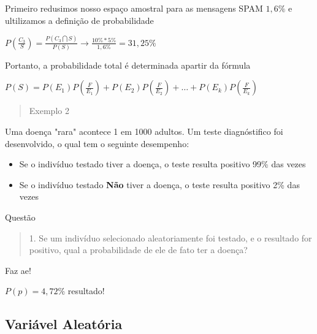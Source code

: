 \documentclass{article}
\begin{document}
    Primeiro redusimos nosso espaço amostral para as mensagens SPAM $ 1,6\% $ e ultilizamos a definição
    de probabilidade 

    \begin{center}
      \begin{large}
        $ P(\frac{C_3}{S}) = \frac{P(C_3 \bigcap S)}{P(S)} \rightarrow  \frac{10\% * 5\%}{1,6\%} = 31,25\% $
      \end{large}
      \end{center}

    Portanto, a probabilidade total é determinada apartir da fórmula
    
    \begin{center}
          $ P(S) = P(E_1) P( \frac{F}{E_1}) + P(E_2) P( \frac{F}{E_2}) + \dots + P(E_k) P( \frac{F}{E_k})  $
    \end{center}

    \newpage
    
    \begin{quote}
      Exemplo 2
    \end{quote}

    Uma doença "rara" acontece 1 em 1000 adultos. Um teste diagnóstifico foi desenvolvido,
    o qual tem o seguinte desempenho:

    \begin{itemize}
      \item Se o indivíduo testado tiver a doença, o teste resulta positivo 99\% das vezes
      \item Se o indivíduo testado \textbf{Não} tiver a doença, o teste resulta positivo 2\% das vezes
    \end{itemize}

    Questão

    \begin{quote}
      1. Se um indivíduo selecionado aleatoriamente foi testado, e o resultado for positivo, qual a 
      probabilidade de ele de fato ter a doença?
    \end{quote}

    Faz ae!

    \begin{center}
    $ P(p) = 4,72\% $ resultado!
    \end{center}
  
    \subsection{Variável Aleatória}

      
    
  
\end{document}

